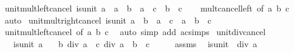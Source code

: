 \begin{isabellebody}
\isanewline
%
\endisadelimproof
\isanewline
{}\isamarkupfalse%
\ unit{\isacharunderscore}{\kern0pt}mult{\isacharunderscore}{\kern0pt}left{\isacharunderscore}{\kern0pt}cancel{\isacharcolon}{\kern0pt}\ {\isachardoublequoteopen}is{\isacharunderscore}{\kern0pt}unit\ a\ {\isasymLongrightarrow}\ a\ {\isacharasterisk}{\kern0pt}\ b\ {\isacharequal}{\kern0pt}\ a\ {\isacharasterisk}{\kern0pt}\ c\ {\isasymlongleftrightarrow}\ b\ {\isacharequal}{\kern0pt}\ c{\isachardoublequoteclose}\isanewline
%
\isadelimproof
\ \ %
\endisadelimproof
%
\isatagproof
{}\isamarkupfalse%
\ mult{\isacharunderscore}{\kern0pt}cancel{\isacharunderscore}{\kern0pt}left\ {\isacharbrackleft}{\kern0pt}of\ a\ b\ c{\isacharbrackright}{\kern0pt}\ \isamarkupfalse%
\ auto%
\endisatagproof
{\isafoldproof}%
%
\isadelimproof
\isanewline
%
\endisadelimproof
\isanewline
{}\isamarkupfalse%
\ unit{\isacharunderscore}{\kern0pt}mult{\isacharunderscore}{\kern0pt}right{\isacharunderscore}{\kern0pt}cancel{\isacharcolon}{\kern0pt}\ {\isachardoublequoteopen}is{\isacharunderscore}{\kern0pt}unit\ a\ {\isasymLongrightarrow}\ b\ {\isacharasterisk}{\kern0pt}\ a\ {\isacharequal}{\kern0pt}\ c\ {\isacharasterisk}{\kern0pt}\ a\ {\isasymlongleftrightarrow}\ b\ {\isacharequal}{\kern0pt}\ c{\isachardoublequoteclose}\isanewline
%
\isadelimproof
\ \ %
\endisadelimproof
%
\isatagproof
{}\isamarkupfalse%
\ unit{\isacharunderscore}{\kern0pt}mult{\isacharunderscore}{\kern0pt}left{\isacharunderscore}{\kern0pt}cancel\ {\isacharbrackleft}{\kern0pt}of\ a\ b\ c{\isacharbrackright}{\kern0pt}\ \isamarkupfalse%
\ {\isacharparenleft}{\kern0pt}auto\ simp\ add{\isacharcolon}{\kern0pt}\ ac{\isacharunderscore}{\kern0pt}simps{\isacharparenright}{\kern0pt}%
\endisatagproof
{\isafoldproof}%
%
\isadelimproof
\isanewline
%
\endisadelimproof
\isanewline
{}\isamarkupfalse%
\ unit{\isacharunderscore}{\kern0pt}div{\isacharunderscore}{\kern0pt}cancel{\isacharcolon}{\kern0pt}\isanewline
\ \ \ {\isachardoublequoteopen}is{\isacharunderscore}{\kern0pt}unit\ a{\isachardoublequoteclose}\isanewline
\ \ \ {\isachardoublequoteopen}b\ div\ a\ {\isacharequal}{\kern0pt}\ c\ div\ a\ {\isasymlongleftrightarrow}\ b\ {\isacharequal}{\kern0pt}\ c{\isachardoublequoteclose}\isanewline
%
\isadelimproof
%
\endisadelimproof
%
\isatagproof
{}\isamarkupfalse%
\ {\isacharminus}{\kern0pt}\isanewline
\ \ \isamarkupfalse%
\ assms\ \isamarkupfalse%
\ {\isachardoublequoteopen}is{\isacharunderscore}{\kern0pt}unit\ {\isacharparenleft}{\kern0pt}{}\ div\ a{\isacharparenright}{\kern0pt}{\isachardoublequoteclose}\ \isamarkupfalse%

\end{isabellebody}

